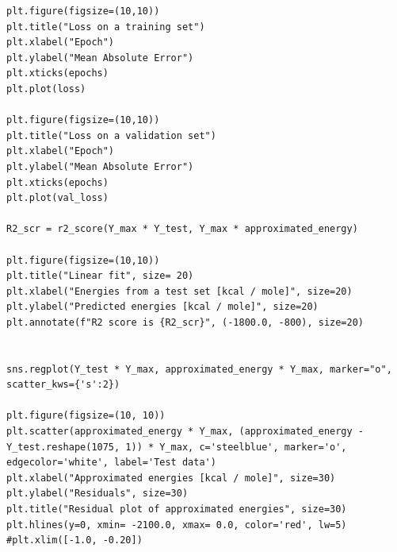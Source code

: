 \documentclass[a4paper,oneside,openright,11pt]{book}
\begin{document}
\begin{lstlisting}
plt.figure(figsize=(10,10))
plt.title("Loss on a training set")
plt.xlabel("Epoch")
plt.ylabel("Mean Absolute Error")
plt.xticks(epochs)
plt.plot(loss)

plt.figure(figsize=(10,10))
plt.title("Loss on a validation set")
plt.xlabel("Epoch")
plt.ylabel("Mean Absolute Error")
plt.xticks(epochs)
plt.plot(val_loss)

R2_scr = r2_score(Y_max * Y_test, Y_max * approximated_energy)

plt.figure(figsize=(10,10))
plt.title("Linear fit", size= 20)
plt.xlabel("Energies from a test set [kcal / mole]", size=20)
plt.ylabel("Predicted energies [kcal / mole]", size=20)
plt.annotate(f"R2 score is {R2_scr}", (-1800.0, -800), size=20)


sns.regplot(Y_test * Y_max, approximated_energy * Y_max, marker="o", scatter_kws={'s':2})

plt.figure(figsize=(10, 10))
plt.scatter(approximated_energy * Y_max, (approximated_energy - Y_test.reshape(1075, 1)) * Y_max, c='steelblue', marker='o', edgecolor='white', label='Test data')
plt.xlabel("Approximated energies [kcal / mole]", size=30)
plt.ylabel("Residuals", size=30)
plt.title("Residual plot of approximated energies", size=30)
plt.hlines(y=0, xmin= -2100.0, xmax= 0.0, color='red', lw=5)
#plt.xlim([-1.0, -0.20])



\end{lstlisting}

\printbibliography[
heading=bibintoc,
title={Bibliography}
]



\end{document}
